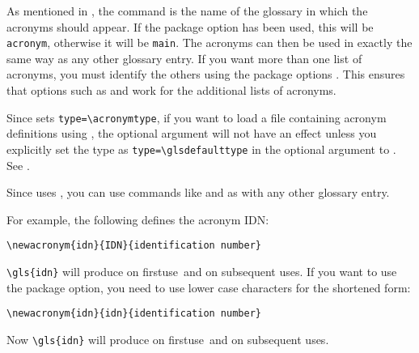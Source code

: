 \documentclass[report]{nlctdoc}
\newcommand*{\firstuse}{\gls{firstuse}}
\begin{document}
As mentioned in , the command
 is the name of the glossary in which the acronyms
should appear. If the  package option has been used,
this will be \texttt{acronym}, otherwise it will be \texttt{main}.
The acronyms can then be used in exactly the same way as any other
glossary entry. If you want more than one list of acronyms, you must
identify the others using the package options .
This ensures that options such as  and
 work for the additional lists of acronyms.

\begin{important}\raggedright
Since  sets \verb|type=\acronymtype|,
if you want to load a file containing acronym definitions using
, the optional argument
 will not have an effect unless you explicitly set the
type as \verb|type=\glsdefaulttype| in the optional argument to
. See .
\end{important}

Since  uses , you can use
commands like  and  as with any other
glossary entry.

For example, the following defines the acronym IDN:
\begin{verbatim}
\newacronym{idn}{IDN}{identification number}
\end{verbatim}
\verb|\gls{idn}| will produce  on
\firstuse\ and  on subsequent uses. If you want to use the
 package option, you need to use lower case
characters for the shortened form:
\begin{verbatim}
\newacronym{idn}{idn}{identification number}
\end{verbatim}
Now \verb|\gls{idn}| will produce  on \firstuse\ and  on subsequent
uses.
\end{document}

